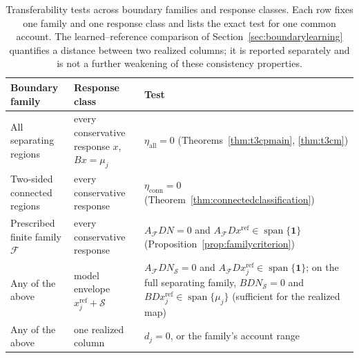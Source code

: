 \documentclass[a4paper,fleqn]{cas-sc}
\begin{document}
\begin{table}[pos=tb]
\footnotesize
\caption{Transferability tests across boundary families and response
classes. Each row fixes one family and one response class and lists
the exact test for one common account. The learned--reference
comparison of Section~\ref{sec:boundarylearning} quantifies a distance
between two realized columns; it is reported separately and is not a
further weakening of these consistency properties.}
\label{tab:threequestions}
\begin{tabular*}{\tblwidth}{@{}p{4.1cm}p{4.6cm}p{5.1cm}@{}}
\toprule Boundary family & Response class & Test\\\midrule
All separating regions & every conservative response $x$, $Bx=\mu_j$ & $\eta_{\mathrm{all}}=0$ (Theorems~\ref{thm:t3cpmain}, \ref{thm:t3cm})\\
Two-sided connected regions & every conservative response & $\eta_{\mathrm{conn}}=0$ (Theorem~\ref{thm:connectedclassification})\\
Prescribed finite family $\mathcal F$ & every conservative response & $A_{\mathcal F}DN=0$ and $A_{\mathcal F}Dx^{\mathrm{ref}}\in\operatorname{span}\{\mathbf 1\}$ (Proposition~\ref{prop:familycriterion})\\
Any of the above & model envelope $x_j^{\mathrm{ref}}+\mathcal S$ & $A_{\mathcal F}DN_{\mathcal S}=0$ and $A_{\mathcal F}Dx_j^{\mathrm{ref}}\in\operatorname{span}\{\mathbf 1\}$; on the full separating family, $BDN_{\mathcal S}=0$ and $BDx_j^{\mathrm{ref}}\in\operatorname{span}\{\mu_j\}$ (sufficient for the realized map)\\
Any of the above & one realized column & $d_j=0$, or the family's account range\\
\bottomrule\end{tabular*}\end{table}
\end{document}
